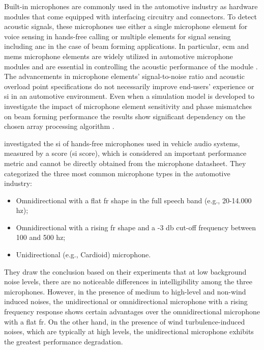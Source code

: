 Built-in microphones are commonly used in the automotive industry as hardware modules that come equipped with interfacing circuitry and connectors. To detect acoustic signals, these microphones use either a single microphone element for voice sensing in hands-free calling or multiple elements for signal sensing including \gls{anc} in the case of beam forming applications. In particular, \gls{ecm} and \gls{mems} microphone elements are widely utilized in automotive microphone modules and are essential in controlling the acoustic performance of the module \cite{Aubauer2001}. The advancements in microphone elements' signal-to-noise ratio and acoustic overload point specifications do not necessarily improve end-users' experience or \gls{si} in an automotive environment. Even when a simulation model is developed to investigate the impact of microphone element sensitivity and phase mismatches on beam forming performance the results show significant dependency on the chosen array processing algorithm \cite{Du2019}. 

\textcite{Du2022} investigated the \gls{si} of hands-free microphones used in vehicle audio systems, measured by a score (\gls{si} score), which is considered an important performance metric and cannot be directly obtained from the microphone datasheet. They categorized the three most common microphone types in the automotive industry:

\begin{itemize}
    \item Omnidirectional with a flat \gls{fr} shape in the full speech band (e.g., 20-14.000 \gls{hz});
    \item Omnidirectional with a rising \gls{fr} shape and a -3 \gls{db} cut-off frequency between 100 and 500 \gls{hz};
    \item Unidirectional (e.g., Cardioid) microphone.   
\end{itemize}

They draw the conclusion based on their experiments that at low background noise levels, there are no noticeable differences in intelligibility among the three microphones. However, in the presence of medium to high-level and non-wind induced noises, the unidirectional or omnidirectional microphone with a rising frequency response shows certain advantages over the omnidirectional microphone with a flat \gls{fr}. On the other hand, in the presence of wind turbulence-induced noises, which are typically at high levels, the unidirectional microphone exhibits the greatest performance degradation.


